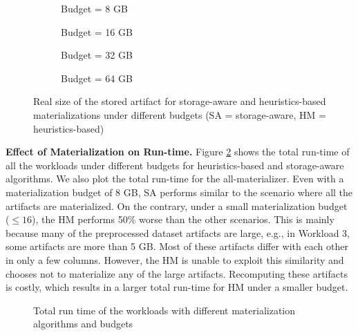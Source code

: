 \begin{figure}
\begin{subfigure}[b]{0.5\linewidth}
\centering
 \resizebox{\columnwidth}{!}{%
%
}
\caption{Budget = 8 GB}
\end{subfigure}%
\begin{subfigure}[b]{0.5\linewidth}
\centering
 \resizebox{\columnwidth}{!}{%
%
}
\caption{Budget = 16 GB}
\end{subfigure}
\begin{subfigure}[b]{0.5\linewidth}
\centering
 \resizebox{\columnwidth}{!}{%
%
}

\caption{Budget = 32 GB}
\end{subfigure}%
\begin{subfigure}[b]{0.5\linewidth}
\centering
 \resizebox{\columnwidth}{!}{%
%
}
\caption{Budget = 64 GB}
\end{subfigure}
\caption{Real size of the stored artifact for storage-aware and heuristics-based materializations under different budgets (SA = storage-aware, HM = heuristics-based)}
\label{exp-sa-vs-simple-size}
\end{figure}

\textbf{Effect of Materialization on Run-time.}
Figure \ref{run-time-vs-mat} shows the total run-time of all the workloads under different budgets for heuristics-based and storage-aware algorithms.
We also plot the total run-time for the all-materializer.
Even with a materialization budget of 8 GB, SA performs similar to the scenario where all the artifacts are materialized.
On the contrary, under a small materialization budget ($\leq 16$), the HM performs 50\% worse than the other scenarios.
This is mainly because many of the preprocessed dataset artifacts are large, e.g., in Workload 3, some artifacts are more than 5 GB.
Most of these artifacts differ with each other in only a few columns.
However, the HM is unable to exploit this similarity and chooses not to materialize any of the large artifacts.
Recomputing these artifacts is costly, which results in a larger total run-time for HM under a smaller budget.

\begin{figure}
\centering
 \resizebox{0.7\columnwidth}{!}{%
%
}
\caption{Total run time of the workloads with different materialization algorithms and budgets}
\label{run-time-vs-mat}
\end{figure}

